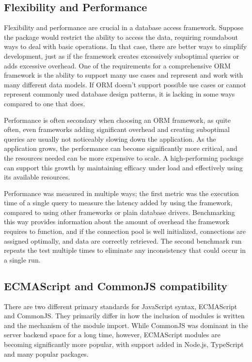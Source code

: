 \subsection{Flexibility and Performance}

Flexibility and performance are crucial in a database access framework. Suppose
the package would restrict the ability to access the data, requiring roundabout
ways to deal with basic operations. In that case, there are better ways to
simplify development, just as if the framework creates excessively suboptimal
queries or adds excessive overhead. One of the requirements for a comprehensive
ORM framework is the ability to support many use cases and represent and work
with many different data models. If ORM doesn't support possible use cases or
cannot represent commonly used database design patterns, it is lacking in some
ways compared to one that does.

Performance is often secondary when choosing an ORM framework, as quite often,
even frameworks adding significant overhead and creating suboptimal queries are
usually not noticeably slowing down the application. As the application grows,
the performance can become significantly more critical, and the resources needed
can be more expensive to scale. A high-performing package can support this
growth by maintaining efficacy under load and effectively using its available
resources.

Performance was measured in multiple ways; the first metric was the execution
time of a single query to measure the latency added by using the framework,
compared to using other frameworks or plain database drivers. Benchmarking this
way provides information about the amount of overhead the framework requires to
function, and if the connection pool is well initialized, connections are
assigned optimally, and data are correctly retrieved. The second benchmark run
repeats the test multiple times to eliminate any inconsistency that could occur
in a single run.

\subsection{ECMAScript and CommonJS compatibility}
There are two different primary standards for JavaScript syntax, ECMAScript and
CommonJS. They primarily differ in how the inclusion of modules is written and
the mechanism of the module import. While CommonJS was dominant in the server
backend space for a long time, however, ECMAScript modules are becoming
significantly more popular, with support added in Node.js, TypeScript and many
popular packages.

